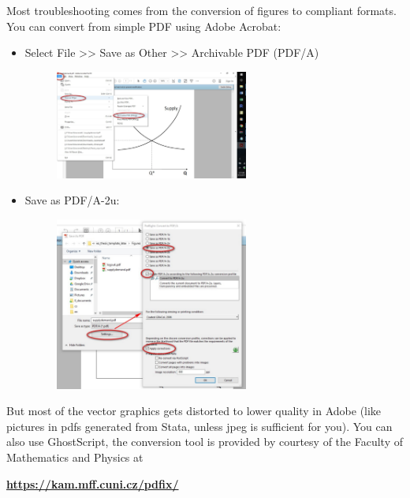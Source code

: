 Most troubleshooting comes from the conversion of figures to compliant formats. You can convert from simple PDF using Adobe Acrobat:
\begin{itemize}
	\item Select File >> Save as Other >> Archivable PDF (PDF/A)
				\begin{figure}[!h]
					\centering
						\includegraphics[width=0.6\textwidth]{Figures/conversion1.pdf}
					\label{fig:conversion1}
				\end{figure}
	\item Save as PDF/A-2u:
			\begin{figure}[!h]
				\centering
					\includegraphics[width=0.6\textwidth]{Figures/conversion2.pdf}
				\label{fig:conversion2}
			\end{figure}
\end{itemize}	


But most of the vector graphics gets distorted to lower quality in Adobe (like pictures in pdfs generated from Stata, unless jpeg is sufficient for you). You can also use GhostScript, the conversion tool is provided by courtesy of the Faculty of Mathematics and Physics at

\vspace{0.5cm}
\textbf{\href{https://kam.mff.cuni.cz/pdfix/}{https://kam.mff.cuni.cz/pdfix/}}
\vspace{0.5cm}

